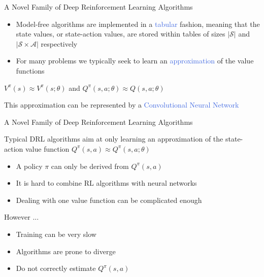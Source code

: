 \documentclass{beamer}
\begin{document}
\begin{frame}{A Novel Family of Deep Reinforcement Learning Algorithms}
	\begin{itemize}
		\item Model-free algorithms are implemented in a \textcolor{RoyalBlue}{tabular} fashion, meaning that the state values, or state-action values, are stored within tables of sizes $|\mathcal{S}|$ and $|\mathcal{S}\times\mathcal{A}|$ respectively

		\item For many problems we typically seek to learn an \textcolor{RoyalBlue}{approximation} of the value functions
	\end{itemize}
	
	\begin{center}

		$V^{\pi}(s)\approx V^\pi{(s;\theta)}$ and $Q^{\pi}(s,a;\theta)\approx Q(s,a;\theta)$
	\end{center}
	
	\bigskip

	This approximation can be represented by a \textcolor{RoyalBlue}{Convolutional Neural Network}

\end{frame}

\begin{frame}{A Novel Family of Deep Reinforcement Learning Algorithms}

	Typical DRL algorithms aim at only learning an approximation of the state-action value function $Q^{\pi}(s,a)\approx Q^{\pi}(s,a;\theta)$

	\begin{itemize}
		\item A policy $\pi$ can only be derived from $Q^{\pi}(s,a)$ 
		\item It is hard to combine RL algorithms with neural networks
		\item Dealing with one value function can be complicated enough
	\end{itemize}

	\bigskip

	However ...

	\begin{itemize}
		\item Training can be very slow 
		\item Algorithms are prone to diverge
		\item Do not correctly estimate $Q^{\pi}(s,a)$
	\end{itemize}

\end{frame}
\end{document}
